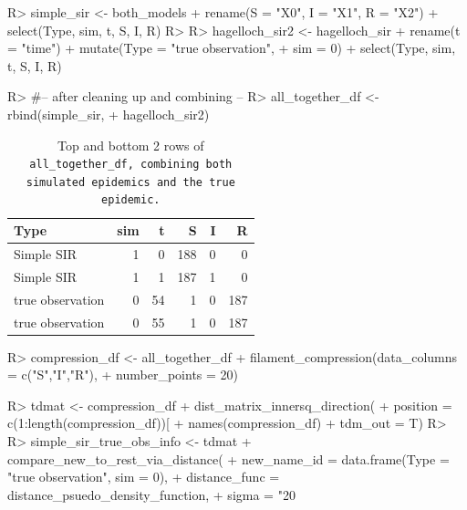 \documentclass[
  shortnames]{jss}
\begin{document}
\begin{CodeChunk}
\begin{CodeInput}
R> simple_sir <- both_models %
+   rename(S = "X0", I = "X1", R = "X2") %
+   select(Type, sim, t, S, I, R)
R> 
R> hagelloch_sir2 <- hagelloch_sir %
+   rename(t = "time") %
+   mutate(Type = "true observation",
+          sim = 0) %
+   select(Type, sim, t, S, I, R)
\end{CodeInput}
\end{CodeChunk}

\begin{CodeChunk}
\begin{CodeInput}
R> #-- after cleaning up and combining --
R> all_together_df <- rbind(simple_sir,
+                          hagelloch_sir2)
\end{CodeInput}
\end{CodeChunk}

\begin{CodeChunk}
\begin{table}[!h]

\caption{\label{tab:cif-all-together-df}Top and bottom 2 rows of \tt{all\_together\_df}\textnormal{, combining both simulated epidemics and the true epidemic.}}
\centering
\begin{tabular}[t]{lrrrrr}
\toprule
Type & sim & t & S & I & R\\
\midrule
Simple SIR & 1 & 0 & 188 & 0 & 0\\
Simple SIR & 1 & 1 & 187 & 1 & 0\\
true observation & 0 & 54 & 1 & 0 & 187\\
true observation & 0 & 55 & 1 & 0 & 187\\
\bottomrule
\end{tabular}
\end{table}

\end{CodeChunk}

\begin{CodeChunk}
\begin{CodeInput}
R> compression_df <- all_together_df %
+   filament_compression(data_columns = c("S","I","R"), 
+                        number_points = 20)
\end{CodeInput}
\end{CodeChunk}

\begin{CodeChunk}
\begin{CodeInput}
R> tdmat <- compression_df %
+   dist_matrix_innersq_direction(
+     position = c(1:length(compression_df))[
+       names(compression_df) %
+     tdm_out = T)
R> 
R> simple_sir_true_obs_info <- tdmat %
+   compare_new_to_rest_via_distance(
+     new_name_id = data.frame(Type = "true observation", sim = 0),
+     distance_func = distance_psuedo_density_function, 
+     sigma = "20%
\end{CodeInput}
\end{CodeChunk}
\end{document}
